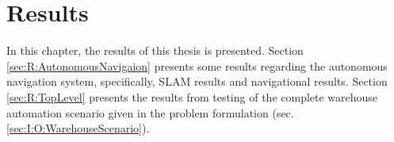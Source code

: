 \chapter{Results}\label{sec:Results}

In this chapter, the results of this thesis is presented. Section \ref{sec:R:AutonomousNavigaion} presents some results regarding the autonomous navigation system, specifically, SLAM results and navigational results. %
Section \ref{sec:R:TopLevel} presents the results from testing of the complete warehouse automation scenario given in the problem formulation (sec. \ref{sec:I:O:WarehouseScenario}). 






